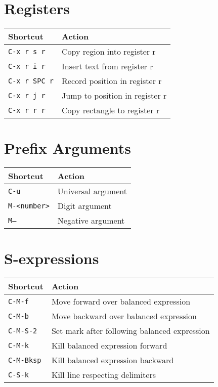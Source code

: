 \documentclass[10pt,landscape]{article}
\newcommand{\key}[1]{\textcolor{keycolor}{\texttt{#1}}}
\begin{document}
\begin{multicols}{2}
\section*{\textcolor{sectioncolor}{Registers}}

\begin{tabular}{@{}p{3cm}p{6.5cm}@{}}
\toprule
\textbf{Shortcut} & \textbf{Action} \\
\midrule
\key{C-x r s r} & Copy region into register r \\
\key{C-x r i r} & Insert text from register r \\
\key{C-x r SPC r} & Record position in register r \\
\key{C-x r j r} & Jump to position in register r \\
\key{C-x r r r} & Copy rectangle to register r \\
\bottomrule
\end{tabular}

\section*{\textcolor{sectioncolor}{Prefix Arguments}}

\begin{tabular}{@{}p{3cm}p{6.5cm}@{}}
\toprule
\textbf{Shortcut} & \textbf{Action} \\
\midrule
\key{C-u} & Universal argument \\
\key{M-<number>} & Digit argument \\
\key{M--} & Negative argument \\
\bottomrule
\end{tabular}

\section*{\textcolor{sectioncolor}{S-expressions}}

\begin{tabular}{@{}p{3cm}p{6.5cm}@{}}
\toprule
\textbf{Shortcut} & \textbf{Action} \\
\midrule
\key{C-M-f} & Move forward over balanced expression \\
\key{C-M-b} & Move backward over balanced expression \\
\key{C-M-S-2} & Set mark after following balanced expression \\
\key{C-M-k} & Kill balanced expression forward \\
\key{C-M-Bksp} & Kill balanced expression backward \\
\key{C-S-k} & Kill line respecting delimiters \\
\bottomrule
\end{tabular}

\end{multicols}
\end{document}
